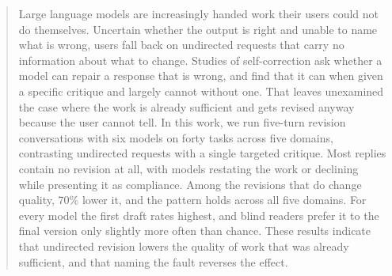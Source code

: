 \begin{abstract}
Large language models are increasingly handed work their users could not do themselves.
Uncertain whether the output is right and unable to name what is wrong, users fall back on
undirected requests that carry no information about what to change. Studies of
self-correction ask whether a model can repair a response that is wrong, and find that it
can when given a specific critique and largely cannot without one. That leaves unexamined
the case where the work is already sufficient and gets revised anyway because the user
cannot tell. In this work, we run five-turn revision conversations with six models on forty
tasks across five domains, contrasting undirected requests with a single targeted critique.
Most replies contain no revision at all, with models restating the work or declining while
presenting it as compliance. Among the revisions that do change quality, 70\% lower it, and
the pattern holds across all five domains. For every model the first draft rates highest,
and blind readers prefer it to the final version only slightly more often than chance. These
results indicate that undirected revision lowers the quality of work that was already
sufficient, and that naming the fault reverses the effect.
\end{abstract}
